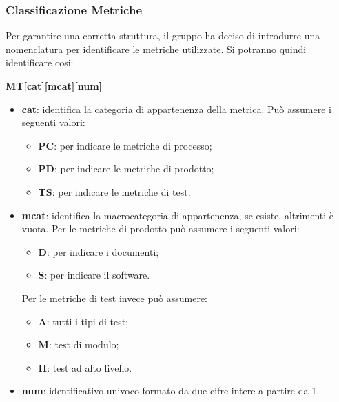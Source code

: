 \subsubsection{Classificazione Metriche}
Per garantire una corretta struttura, il gruppo ha deciso di introdurre una nomenclatura per identificare le metriche utilizzate. Si potranno quindi identificare cosi:
\begin{center}
	\textbf{MT[cat][mcat][num]}
\end{center}
\begin{itemize}
		\item \textbf{cat}: identifica la categoria di appartenenza della metrica. Può assumere i seguenti valori:
	\begin{itemize}
		\item \textbf{PC}: per indicare le metriche di processo;
		\item \textbf{PD}: per indicare le metriche di prodotto;
		\item \textbf{TS}: per indicare le metriche di test.
	\end{itemize}
	\item \textbf{mcat}: identifica la macrocategoria di appartenenza, se esiste, altrimenti è vuota. Per le metriche di prodotto può assumere i seguenti valori:
	\begin{itemize}
		\item \textbf{D}: per indicare i documenti;
		\item \textbf{S}: per indicare il software.
	\end{itemize}
	Per le metriche di test invece può assumere:
	\begin{itemize}
		\item \textbf{A}: tutti i tipi di test;
		\item \textbf{M}: test di modulo;
		\item \textbf{H}: test ad alto livello.
	\end{itemize}
	\item \textbf{num}: identificativo univoco formato da due cifre intere a partire da 1.
\end{itemize}

